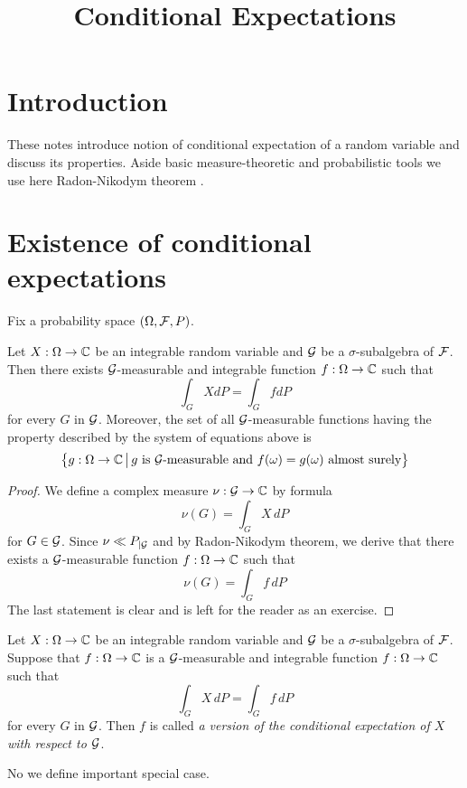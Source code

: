 



\title{Conditional Expectations}
\date{}
\maketitle
\section{Introduction}
These notes introduce notion of conditional expectation of a random variable and discuss its properties. Aside basic measure-theoretic and probabilistic tools we use here Radon-Nikodym theorem {\cite[Theorem 5.1]{RadonNikodymHahnJordanLebesguedecomposition}}.

\section{Existence of conditional expectations}
\noindent
Fix a probability space $(\Omega, {\mathcal F}, P)$.

\begin{theorem}\label{theorem:existenceofconditionalexpectationforintegrable}
Let $X:\Omega \rightarrow {\mathbb C}$ be an integrable random variable and ${\mathcal G}$ be a $\sigma$-subalgebra of ${\mathcal F}$. Then there exists ${\mathcal G}$-measurable and integrable function $f:\Omega \rightarrow {\mathbb C}$ such that
$$\int_GXdP = \int_G f dP$$
for every $G$ in ${\mathcal G}$. Moreover, the set of all ${\mathcal G}$-measurable functions having the property described by the system of equations above is
$$\big\{g:\Omega \rightarrow {\mathbb C}\,\big|\,g\mbox{ is }{\mathcal G}\mbox{-measurable and }f(\omega)=g(\omega)\mbox{ almost surely}\big\}$$
\end{theorem}
\begin{proof}
We define a complex measure $\nu:{\mathcal G}\rightarrow {\mathbb C}$ by formula
$$\nu(G) = \int_G X\,dP$$
for $G\in {\mathcal G}$. Since $\nu \ll P_{\mid {\mathcal G}}$ and by Radon-Nikodym theorem, we derive that there exists a ${\mathcal G}$-measurable function $f:\Omega \rightarrow {\mathbb C}$ such that
$$\nu(G) = \int_G f\,dP$$
The last statement is clear and is left for the reader as an exercise.
\end{proof}

\begin{definition}
Let $X:\Omega \rightarrow {\mathbb C}$ be an integrable random variable and ${\mathcal G}$ be a $\sigma$-subalgebra of ${\mathcal F}$. Suppose that $f:\Omega \rightarrow {\mathbb C}$ is a ${\mathcal G}$-measurable and integrable function $f:\Omega \rightarrow {\mathbb C}$ such that 
$$\int_GX\,dP = \int_G f\, dP$$
for every $G$ in ${\mathcal G}$. Then $f$ is called \textit{a version of the conditional expectation of $X$ with respect to ${\mathcal G}$}.
\end{definition}
\noindent
No we define important special case.

